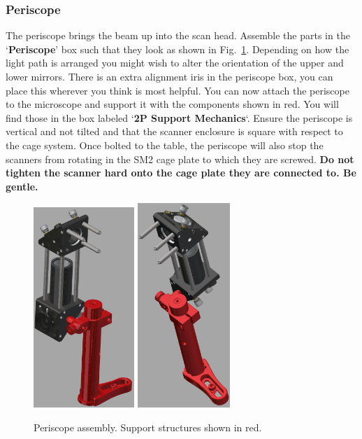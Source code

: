 \documentclass[a4paper]{report}
\begin{document}
\subsubsection{Periscope}
The periscope brings the beam up into the scan head. 
Assemble the parts in the `\textbf{Periscope}' box such that they look as shown in Fig.~\ref{fig:periscope}. 
Depending on how the light path is arranged you might wish to alter the orientation of the upper and lower mirrors. 
There is an extra alignment iris in the periscope box, you can place this wherever you think is most helpful.
You can now attach the periscope to the microscope and support it with the components shown in red. 
You will find those in the box labeled `\textbf{2P Support Mechanics}`.
Ensure the periscope is vertical and not tilted and that the scanner enclosure is square with respect to the cage system. 
Once bolted to the table, the periscope will also stop the scanners from rotating in the SM2 cage plate to which they are screwed.
\textbf{Do not tighten the scanner hard onto the cage plate they are connected to. Be gentle.}


\begin{figure}[h]
\center
\includegraphics[width=1.5in]{periscope_01.eps}
\includegraphics[width=1.38in]{periscope_02.eps}
\caption{Periscope assembly. Support structures shown in red.}
\label{fig:periscope}
\end{figure}
\end{document}
